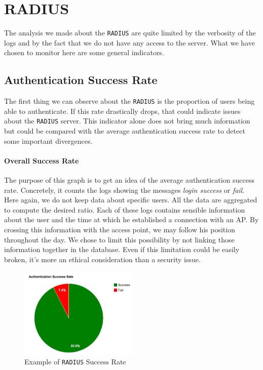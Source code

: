\section{RADIUS}
The analysis we made about the \texttt{RADIUS} are quite limited by the verbosity of the logs and by the fact that we do not have any access to the server. What we have chosen to monitor here are some general indicators.

\subsection{Authentication Success Rate}
The first thing we can observe about the \texttt{RADIUS} is the proportion of users being able to authenticate. If this rate drastically drops, that could indicate issues about the \texttt{RADIUS} server. This indicator alone does not bring much information but could be compared with the average authentication success rate to detect some important divergences.

\paragraph*{Overall Success Rate} The purpose of this graph is to get an idea of the average authentication success rate. Concretely, it counts the logs showing the messages \textit{login success} or \textit{fail}. Here again, we do not keep data about specific users. All the data are aggregated to compute the desired ratio. Each of these logs contains sensible information about the user and the time at which he established a connection with an AP. By crossing this information with the access point, we may follow his position throughout the day. We chose to limit this possibility by not linking those information together in the database. Even if this limitation could be easily broken, it's more an ethical consideration than a security issue.

\begin{figure}[H]
	\centering
   \includegraphics[width=0.5\textwidth]{Pictures/chapter5/radiusRate.jpg}
   \caption{Example of \texttt{RADIUS} Success Rate}
\end{figure} 

